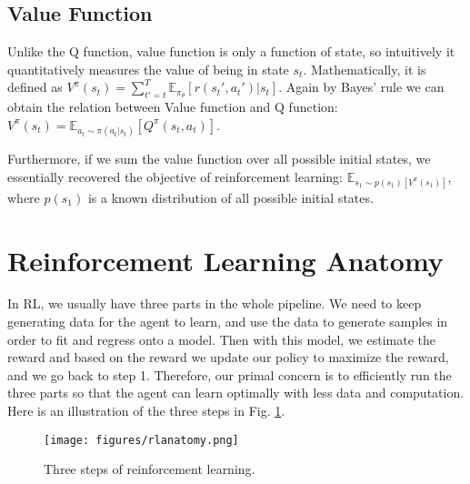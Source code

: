 \subsection{Value Function}
Unlike the Q function, value function is only a function of state, so intuitively it quantitatively measures the value of being in state $s_t$. Mathematically, it is defined as $V^\pi(s_t) =\sum_{t'=t}^T{\mathbb{E}_{\pi_\theta}[r(s_t',a_t')|s_t]}$. Again by Bayes' rule we can obtain the relation between Value function and Q function: $V^\pi(s_t)=\mathbb{E}_{a_t\sim\pi(a_t|s_t)}[Q^\pi(s_t,a_t)]$.

Furthermore, if we sum the value function over all possible initial states, we essentially recovered the objective of reinforcement learning: $\mathbb{E}_{s_1\sim p(s_1)[V^\pi(s_1)]}$, where $p(s_1)$ is a known distribution of all possible initial states.
\section{Reinforcement Learning Anatomy}
In RL, we usually have three parts in the whole pipeline. We need to keep generating data for the agent to learn, and use the data to generate samples in order to fit and regress onto a model. Then with this model, we estimate the reward and based on the reward we update our policy to maximize the reward, and we go back to step 1. Therefore, our primal concern is to efficiently run the three parts so that the agent can learn optimally with less data and computation. Here is an illustration of the three steps in Fig. \ref{fig:rlanatomy}.
\begin{figure}
    \centering
    \texttt{[image: figures/rlanatomy.png]}
    \caption{Three steps of reinforcement learning.}
    \label{fig:rlanatomy}
\end{figure}